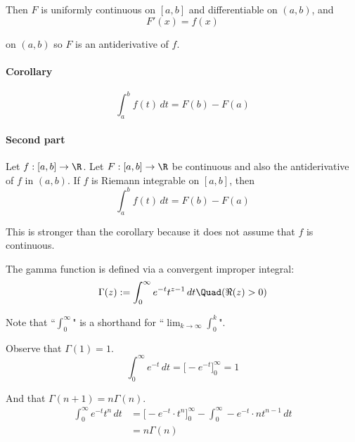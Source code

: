 Then $F$ is uniformly continuous on $[a,b]$ and differentiable on
$(a,b)$, and
$$F'(x)=f(x)$$

on $(a,b)$ so $F$ is an antiderivative of $f$.

\paragraph{Corollary}
$$\int_a^bf(t)\,dt=F(b)-F(a)$$

\paragraph{Second part} Let $f:[a,b]\to\R$. Let $F:[a,b]\to\R$ be
continuous and also the antiderivative of $f$ in $(a,b)$. If $f$ is
Riemann integrable on $[a,b]$, then
$$\int_a^bf(t)\,dt=F(b)-F(a)$$

This is stronger than the corollary because it does not assume that
$f$ is continuous.


The gamma function is defined via a convergent improper integral:
$$
	\Gamma(z):=\int_0^\infty e^{-t}t^{z-1}\,dt\Quad(\Re(z)>0)
$$

Note that ``$\displaystyle\int_0^\infty$" is a shorthand for
``$\displaystyle\lim_{k\to\infty}\int_0^k$".

Observe that $\Gamma(1)=1$.
$$\int_0^\infty e^{-t}\,dt=\Big[-e^{-t}\Big]_0^\infty=1$$

And that $\Gamma(n+1)=n\Gamma(n)$.
\begin{align*}
	\int_0^\infty e^{-t}t^n\,dt
	 & = \Big[-e^{-t}\cdot t^n\Big]_0^\infty-\int_0^\infty-e^{-t}\cdot nt^{n-1}\,dt \\
	 & = n\Gamma(n)
\end{align*}
